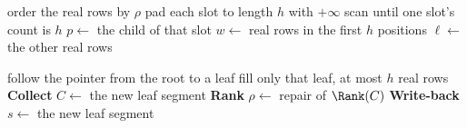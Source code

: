 \begin{algorithm}[t]
\caption{Replay}
\label{alg:replay_segment_node}
order the real rows by $\rho$\;
pad each slot to length $h$ with $+\infty$\;
scan until one slot's count is $h$\;
$p\leftarrow$ the child of that slot\;
$w\leftarrow$ real rows in the first $h$ positions\;
$\ell\leftarrow$ the other real rows\;
\end{algorithm}

\begin{algorithm}[t]
\caption{Refresh}
\label{alg:refresh_loser_tree_path}
follow the pointer from the root to a leaf\;
fill only that leaf, at most $h$ real rows\;
\textbf{Collect}\;
$C\leftarrow$ the new leaf segment\;
\textbf{Rank}\;
$\rho\leftarrow$ repair of $\Rank(C)$\;
\textbf{Write-back}\;
$s\leftarrow$ the new leaf segment\;
\end{algorithm}